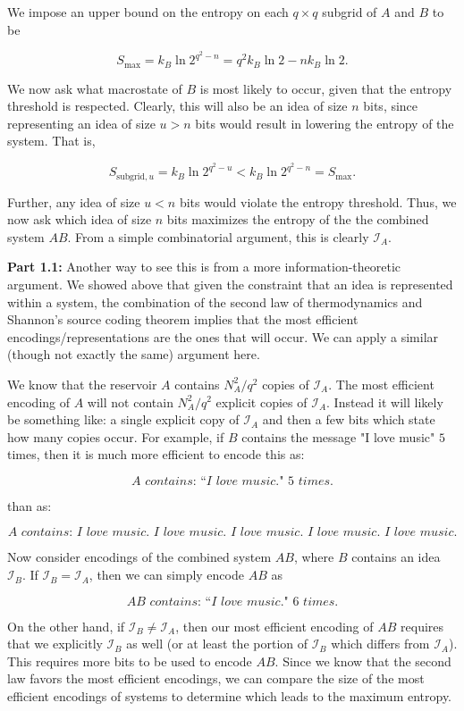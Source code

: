 \documentclass{article}
\begin{document}
We impose  an upper bound on the entropy on each $q\times q$ subgrid of $A$ and $B$ to be 

\[ S_\text{max} = k_B\ln{2^{q^2-n}} = q^2k_B\ln{2} - nk_B\ln{2}. \]

We now ask what macrostate of $B$ is most likely to occur, given that the entropy threshold is respected. Clearly, this will also be an idea of size $n$ bits, since representing an idea of size $u>n$ bits would result in lowering the entropy of the system. That is,

\[ S_{\text{subgrid},u} = k_B\ln{2^{q^2-u}} < k_B\ln{2^{q^2-n}} = S_\text{max}. \]

Further, any idea of size $u<n$ bits would violate the entropy threshold. Thus, we now ask which idea of size $n$ bits maximizes the entropy of the the combined system $AB$. From a simple combinatorial argument, this is clearly $\mathcal{I}_A$.

\textbf{Part 1.1:} Another way to see this is from a more information-theoretic argument. We showed above that given the constraint that an idea is represented within a system, the combination of the second law of thermodynamics and Shannon's source coding theorem implies that the most efficient encodings/representations are the ones that will occur. We can apply a similar (though not exactly the same) argument here. 

We know that the reservoir $A$ contains $N_A^2/q^2$ copies of $\mathcal{I}_A$. The most efficient encoding of $A$ will not contain $N_A^2/q^2$ explicit copies of $\mathcal{I}_A$. Instead it will likely be something like: a single explicit copy of $\mathcal{I}_A$ and then a few bits which state how many copies occur. For example, if $B$ contains the message "I love music" $5$ times, then it is much more efficient to encode this as: 

\[\textit{A contains: ``I love music." 5 times.}\]

than as:

\[ \textit{A contains: I love music. I love music. I love music. I love music. I love music.} \]

Now consider encodings of the combined system $AB$, where $B$ contains an idea $\mathcal{I}_B$. If $\mathcal{I}_B=\mathcal{I}_A$, then we can simply encode $AB$ as 

\[\textit{AB contains: ``I love music." 6 times.}\]

On the other hand, if $\mathcal{I}_B\neq\mathcal{I}_A$, then our most efficient encoding of $AB$ requires that we explicitly $\mathcal{I}_B$ as well (or at least the portion of $\mathcal{I}_B$ which differs from $\mathcal{I}_A$). This requires more bits to be used to encode $AB$. Since we know that the second law favors the most efficient encodings, we can compare the size of the most efficient encodings of  systems to determine which leads to the maximum entropy.\newline
\end{document}
